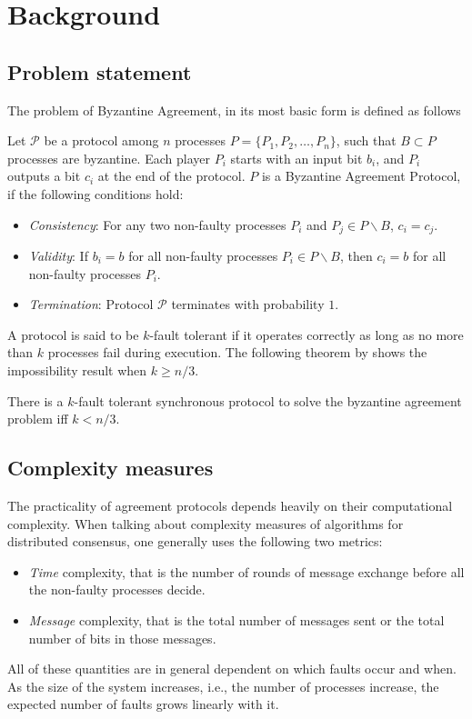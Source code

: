 ﻿\section{Background}
\label{sec:background}

\subsection{Problem statement}
The problem of Byzantine Agreement, in its most basic form is defined as follows

\begin{definition}
Let $\mathcal{P}$ be a protocol among $n$ processes $P = \{ P_1, P_2, \dots, P_n\}$, such that $B \subset P$ processes are byzantine. Each player $P_i$ starts with an input bit $b_i$, and $P_i$ outputs a bit $c_i$ at the end of the protocol. $P$ is a Byzantine Agreement Protocol, if the following conditions hold:
\begin{itemize}
    \item \textit{Consistency}: For any two non-faulty processes $P_i$ and $P_j \in P \backslash B$, $c_i = c_j$.
    \item \textit{Validity}: If $b_i = b$ for all non-faulty processes $P_i \in P \backslash B$, then $c_i = b$ for all non-faulty processes $P_i$.
    \item \textit{Termination}: Protocol $\mathcal{P}$ terminates with probability $1$.
\end{itemize}
\end{definition}

A protocol is said to be $k$-fault tolerant if it operates correctly as long as no more than $k$ processes fail during execution. The following theorem by \cite{LamportSP82,PeaseSL80} shows the impossibility result when $k \geq n/3$.

\begin{theorem}
There is a $k$-fault tolerant synchronous protocol to solve the byzantine agreement problem iff $k < n/3$.
\end{theorem}

\subsection{Complexity measures}

The practicality of agreement protocols depends heavily on their computational complexity. When talking about complexity measures of algorithms for distributed consensus, one generally uses the following two metrics:
\begin{itemize}
\item \textit{Time} complexity, that is the number of rounds of message exchange before all the non-faulty processes decide.
\item \textit{Message} complexity, that is the total number of messages sent or the total number of bits in those messages.
\end{itemize}
All of these quantities are in general dependent on which faults occur and when. As the size of the system increases, i.e., the number of processes increase, the expected number of faults grows linearly with it. 


